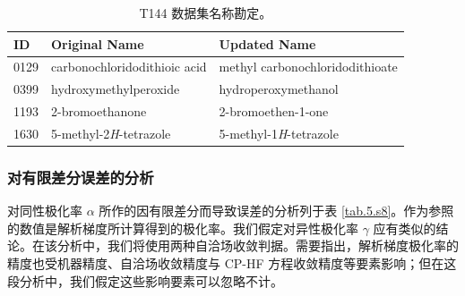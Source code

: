 \begin{table}[H]
    \centering
    \caption{T144 数据集名称勘定。}
    \label{tab.T144-name-errata}
    \begin{tabular}{lll}
    \hline
    ID   & Original   Name                & Updated   Name                    \\ \hline
    0129 & carbonochloridodithioic   acid & methyl   carbonochloridodithioate \\
    0399 & hydroxymethylperoxide          & hydroperoxymethanol               \\
    1193 & 2-bromoethanone                & 2-bromoethen-1-one                \\
    1630 & 5-methyl-2\textit{H}-tetrazole          & 5-methyl-1\textit{H}-tetrazole             \\ \hline
    \end{tabular}
\end{table}

\subsubsection{对有限差分误差的分析}
\label{sec.5.s9}

对同性极化率 $\alpha$ 所作的因有限差分而导致误差的分析列于表 \ref{tab.5.s8}。作为参照的数值是解析梯度所计算得到的极化率。我们假定对异性极化率 $\gamma$ 应有类似的结论。在该分析中，我们将使用两种自洽场收敛判据。需要指出，解析梯度极化率的精度也受机器精度、自洽场收敛精度与 CP-HF 方程收敛精度等要素影响；但在这段分析中，我们假定这些影响要素可以忽略不计。

